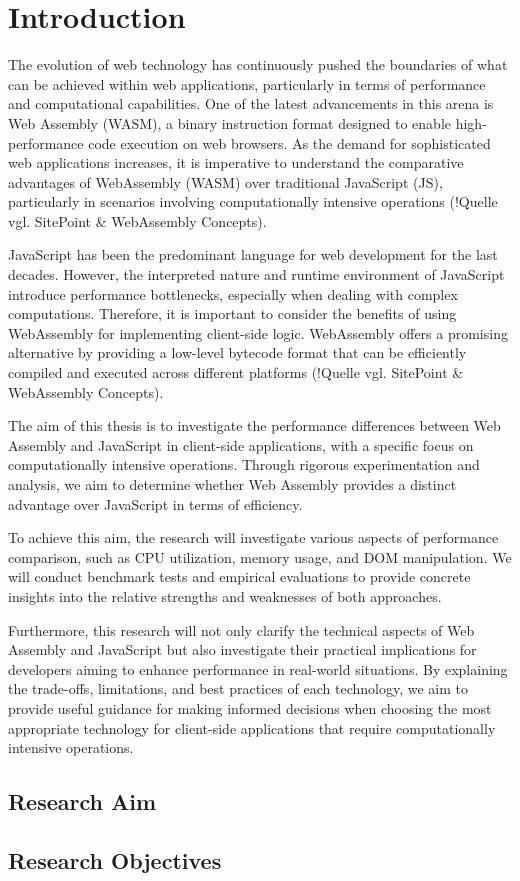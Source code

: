 \newpage

\section{Introduction} \label{introduction}
The evolution of web technology has continuously pushed the boundaries of what can be achieved within web applications, particularly in terms of performance and computational capabilities. One of the latest advancements in this arena is Web Assembly (WASM), a binary instruction format designed to enable high-performance code execution on web browsers. As the demand for sophisticated web applications increases, it is imperative to understand the comparative advantages of WebAssembly (WASM) over traditional JavaScript (JS), particularly in scenarios involving computationally intensive operations (!Quelle vgl. SitePoint & WebAssembly Concepts).

JavaScript has been the predominant language for web development for the last decades. However, the interpreted nature and runtime environment of JavaScript introduce performance bottlenecks, especially when dealing with complex computations. Therefore, it is important to consider the benefits of using WebAssembly for implementing client-side logic. WebAssembly offers a promising alternative by providing a low-level bytecode format that can be efficiently compiled and executed across different platforms (!Quelle vgl. SitePoint & WebAssembly Concepts).

The aim of this thesis is to investigate the performance differences between Web Assembly and JavaScript in client-side applications, with a specific focus on computationally intensive operations. Through rigorous experimentation and analysis, we aim to determine whether Web Assembly provides a distinct advantage over JavaScript in terms of efficiency.

To achieve this aim, the research will investigate various aspects of performance comparison, such as CPU utilization, memory usage, and DOM manipulation. We will conduct benchmark tests and empirical evaluations to provide concrete insights into the relative strengths and weaknesses of both approaches.

Furthermore, this research will not only clarify the technical aspects of Web Assembly and JavaScript but also investigate their practical implications for developers aiming to enhance performance in real-world situations. By explaining the trade-offs, limitations, and best practices of each technology, we aim to provide useful guidance for making informed decisions when choosing the most appropriate technology for client-side applications that require computationally intensive operations.

\subsection{Research Aim} \label{aim}

\subsection{Research Objectives} \label{objectives}
